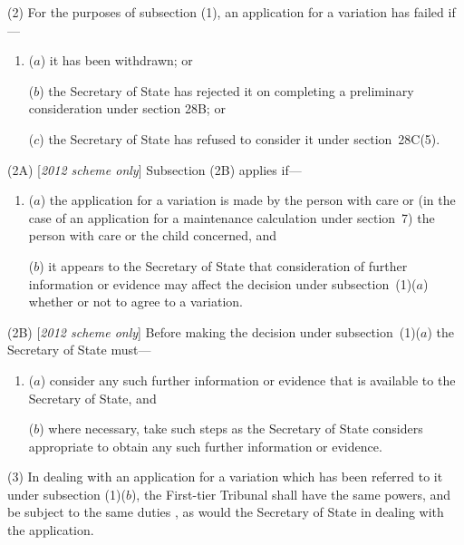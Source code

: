 \documentclass[12pt,a4paper]{article}
\begin{document}
(2) For the purposes of subsection (1), 
an application for a variation  %
has failed if—
\begin{enumerate}\item[]
($a$) it has 
been withdrawn; or

($b$) the 
Secretary of State  %
has rejected it on completing a preliminary consideration under section 28B;
or  %

($c$) the 
Secretary of State  %
has refused to consider it under section~28C(5).
\end{enumerate}

(2A) [\emph{2012 scheme only}] Subsection (2B) applies if—
\begin{enumerate}\item[]
($a$) the application for a variation is made by the person with care or (in the case of an application for a maintenance calculation under section~7) the person with care or the child concerned, and

($b$) it appears to the Secretary of State that consideration of further information or evidence may affect the decision under subsection~(1)($a$) whether or not to agree to a variation.
\end{enumerate}

(2B) [\emph{2012 scheme only}] Before making the decision under subsection~(1)($a$) the Secretary of State must—
\begin{enumerate}\item[]
($a$) consider any such further information or evidence that is available to the Secretary of State, and

($b$) where necessary, take such steps as the Secretary of State considers appropriate to obtain any such further information or evidence.
\end{enumerate}

(3) In dealing with 
an application for a variation  %
which has been referred to it under subsection (1)($b$), 
the First-tier Tribunal  %
shall have the same powers, and be subject to the same duties%
, as would the 
Secretary of State in  %
dealing with the application.
\end{document}
